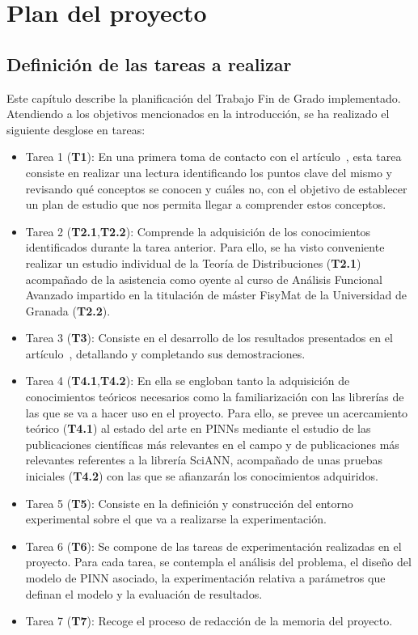 \chapter{Plan del proyecto}\label{ch:primer-capitulo}
\section{Definición de las tareas a realizar}

Este capítulo describe la planificación del Trabajo Fin de Grado implementado. Atendiendo a los objetivos mencionados en la introducción, se ha realizado el siguiente desglose en tareas: 
\begin{itemize}
    \item Tarea 1 (\textbf{T1}): En una primera toma de contacto con el artículo~\cite{chen1995universal}, esta tarea consiste en realizar una lectura identificando los puntos clave del mismo y revisando qué conceptos se conocen y cuáles no, con el objetivo de establecer un plan de estudio que nos permita llegar a comprender estos conceptos.
    \item Tarea 2 (\textbf{T2.1},\textbf{T2.2}): Comprende la adquisición de los conocimientos identificados durante la tarea anterior. Para ello, se ha visto conveniente realizar un estudio individual de la Teoría de Distribuciones (\textbf{T2.1}) acompañado de la asistencia como oyente al curso de Análisis Funcional Avanzado impartido en la titulación de máster FisyMat de la Universidad de Granada (\textbf{T2.2}).
    \item Tarea 3 (\textbf{T3}): Consiste en el desarrollo de los resultados presentados en el artículo~\cite{chen1995universal}, detallando y completando sus demostraciones.
    \item Tarea 4 (\textbf{T4.1},\textbf{T4.2}): En ella se engloban tanto la adquisición de conocimientos teóricos necesarios como la familiarización con las librerías de las que se va a hacer uso en el proyecto. Para ello, se prevee un acercamiento teórico (\textbf{T4.1}) al estado del arte en PINNs mediante el estudio de las publicaciones científicas más relevantes en el campo y de publicaciones más relevantes referentes a la librería SciANN, acompañado de unas pruebas iniciales (\textbf{T4.2}) con las que se afianzarán los conocimientos adquiridos.   
    \item Tarea 5 (\textbf{T5}): Consiste en la definición y construcción del entorno experimental sobre el que va a realizarse la experimentación.
    \item Tarea 6 (\textbf{T6}): Se compone de las tareas de experimentación realizadas en el proyecto. Para cada tarea, se contempla el análisis del problema, el diseño del modelo de PINN asociado, la experimentación relativa a parámetros que definan el modelo y la evaluación de resultados. 
    \item Tarea 7 (\textbf{T7}): Recoge el proceso de redacción de la memoria del proyecto. 
\end{itemize}



